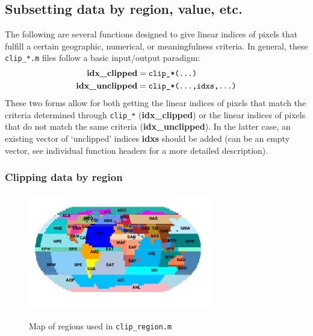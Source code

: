 \documentclass{article}
\begin{document}
\subsection{Subsetting data by region, value, etc.}
The following are several functions designed to give linear indices of pixels that fulfill a certain geographic, numerical, or meaningfulness criteria. In general, these \texttt{clip\_*.m} files follow a basic input/output paradigm:
\begin{equation}
\begin{aligned}
\textbf{idx\_clipped} &= \texttt{clip\_*(\dots)} \\
\textbf{idx\_unclipped} &= \texttt{clip\_*(\dots,idxs,\dots)}
\end{aligned}
\end{equation}
These two forms allow for both getting the linear indices of pixels that match the criteria determined through \texttt{clip\_*} (\textbf{idx\_clipped}) or the linear indices of pixels that do not match the same criteria (\textbf{idx\_unclipped}). In the latter case, an existing vector of `unclipped' indices \textbf{idxs} should be added (can be an empty vector, see individual function headers for a more detailed description). 

\subsubsection{Clipping data by region}
\begin{figure}[h] %
\centering
	\includegraphics[width=19pc,angle=0]{RegionsMap.pdf}\\
	\caption{Map of regions used in \texttt{clip\_region.m}}\label{fig:regions_map}
\end{figure}
\end{document}
